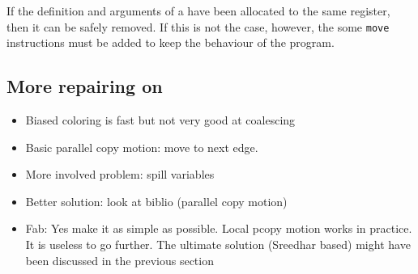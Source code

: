 {If the definition and arguments 
of a \phifun have been allocated to the same register, then it can be safely 
removed. If this is not the case, however, the some {\tt move} instructions 
must be added to keep the behaviour of the program. 



\subsection{More repairing on \phifuns}
\begin{itemize}
  \item Biased coloring is fast but not very good at coalescing
  \item Basic parallel copy motion: move to next edge.
  \item More involved problem: spill variables
  \item Better solution: look at biblio (parallel copy motion)
  \item Fab: Yes make it as simple as possible. Local pcopy motion works in practice. It is useless to go further. The ultimate solution (Sreedhar based) might have been discussed in the previous section
\end{itemize}


\endofchapter
}
